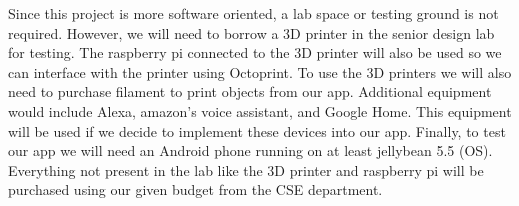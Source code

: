 Since this project is more software oriented, a lab space or testing ground is not required. However, we will need to borrow a 3D printer in the senior design lab for testing. The raspberry pi connected to the 3D printer will also be used so we can interface with the printer using Octoprint. To use the 3D printers we will also need to purchase filament to print objects from our app. Additional equipment would include Alexa, amazon's voice assistant, and Google Home. This equipment will be used if we decide to implement these devices into our app. Finally, to test our app we will need an Android phone running on at least jellybean 5.5 (OS). Everything not present in the lab like the 3D printer and raspberry pi will be purchased using our given budget from the CSE department. 